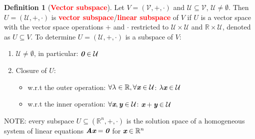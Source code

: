 \documentclass[12pt]{article}
\theoremstyle{definition}
\newtheorem{definition}{Definition}[section]
\newcommand{\keyword}[1]{\textbf{\textcolor{red}{#1}}}
\newcommand{\mat}[1]{\textit{\textbf{#1}}}
\begin{document}
        \newpage
        \begin{definition}[\keyword{Vector subspace}]
            Let $V=(\mathcal{V},+,\cdot)$ and $\mathcal{U}\subseteq\mathcal{V}$, 
            $\mathcal{U}\neq\emptyset$. Then $U=(\mathcal{U},+,\cdot)$ is 
            \keyword{vector subspace}/\keyword{linear subspace} of $V$ if $U$ is
            a vector space with the vector space operations $+$ and $\cdot$ 
            restricted to $\mathcal{U}\times\mathcal{U}$ and 
            $\mathbb{R}\times\mathcal{U}$, denoted as $U\subseteq V$.
            To determine $U=(\mathcal{U}, +, \cdot)$ is a subspace of $V$:
            \begin{enumerate}
                \item $\mathcal{U}\neq\emptyset$, in particular: 
                    $\mat{0}\in\mathcal{U}$
                \item Closure of $U$:
                    \begin{itemize}
                        \item w.r.t the outer operation: $\forall\lambda\in\mathbb{R},\forall\mat{x}\in\mathcal{U}$: $\lambda\mat{x}\in\mathcal{U}$
                        \item w.r.t the inner operation: $\forall\mat{x},\mat{y}\in\mathcal{U}$: $\mat{x}+\mat{y}\in\mathcal{U}$
                    \end{itemize}
            \end{enumerate}
            NOTE: every subspace $U\subseteq(\mathbb{R}^n, +, \cdot)$ is the 
            solution space of a homogeneous system of linear equations 
            $\mat{A}\mat{x}=\mat{0}$ for $\mat{x}\in\mathbb{R}^n$
        \end{definition}
    \section{}
    \section{}
    \section{}
    \section{}
\end{document}
